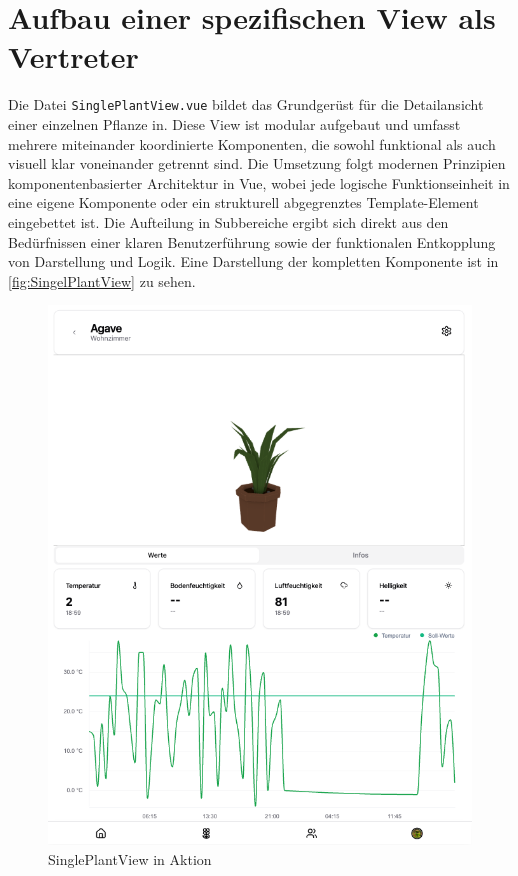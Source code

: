 \section{Aufbau einer spezifischen View als Vertreter}
Die Datei \texttt{SinglePlantView.vue} bildet das Grundgerüst für die Detailansicht einer einzelnen Pflanze in. Diese View ist modular aufgebaut und umfasst mehrere miteinander koordinierte Komponenten, die sowohl funktional als auch visuell klar voneinander getrennt sind. Die Umsetzung folgt modernen Prinzipien komponentenbasierter Architektur in Vue, wobei jede logische Funktionseinheit in eine eigene Komponente oder ein strukturell abgegrenztes Template-Element eingebettet ist. Die Aufteilung in Subbereiche ergibt sich direkt aus den Bedürfnissen einer klaren Benutzerführung sowie der funktionalen Entkopplung von Darstellung und Logik. Eine Darstellung der kompletten Komponente ist in \vref{fig:SingelPlantView} zu sehen.

\begin{figure}[H]
	\centering
	\includegraphics[scale=.5]{"./Umsetzung/images/sensora.png"}
	\caption{SinglePlantView in Aktion}
	\label{fig:SingelPlantView}
\end{figure}

